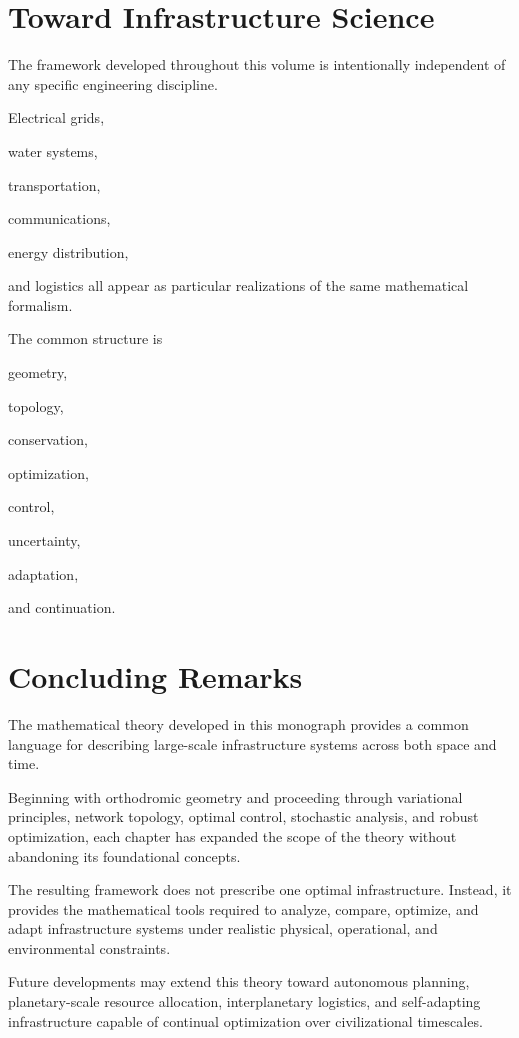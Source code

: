 \documentclass[11pt,fleqn]{book}
\numberwithin{equation}{chapter}
\theoremstyle{plain}
\theoremstyle{definition}
\theoremstyle{remark}
\begin{document}
\section{Toward Infrastructure Science}

The framework developed throughout this volume is intentionally
independent of any specific engineering discipline.

Electrical grids,

water systems,

transportation,

communications,

energy distribution,

and logistics all appear as particular realizations of the same
mathematical formalism.

The common structure is

geometry,

topology,

conservation,

optimization,

control,

uncertainty,

adaptation,

and continuation.


\section{Concluding Remarks}

The mathematical theory developed in this monograph provides a common
language for describing large-scale infrastructure systems across both
space and time.

Beginning with orthodromic geometry and proceeding through variational
principles, network topology, optimal control, stochastic analysis, and
robust optimization, each chapter has expanded the scope of the theory
without abandoning its foundational concepts.

The resulting framework does not prescribe one optimal infrastructure.
Instead, it provides the mathematical tools required to analyze,
compare, optimize, and adapt infrastructure systems under realistic
physical, operational, and environmental constraints.

Future developments may extend this theory toward autonomous planning,
planetary-scale resource allocation, interplanetary logistics, and
self-adapting infrastructure capable of continual optimization over
civilizational timescales.
\end{document}
